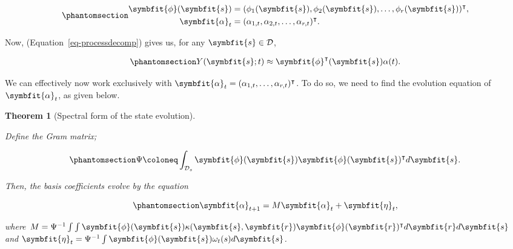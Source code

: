 \documentclass[
]{report}
\newcommand{\bv}[1]{\symbfit{#1}}
\theoremstyle{plain}
\theoremstyle{plain}
\newtheorem{theorem}{Theorem}[section]
\theoremstyle{plain}
\theoremstyle{remark}
\begin{document}
\begin{equation}\phantomsection\label{eq-vecmats}{\begin{split}
\bv \phi(\bv s) &= (\phi_1(\bv s), \phi_2(\bv s), \dots, \phi_r(\bv s))^{\intercal},\\
\bv \alpha_t &= (\alpha_{1,t}, \alpha_{2,t}, \dots, \alpha_{r, t})^{\intercal}.
\end{split}
}\end{equation}

Now, (Equation~\ref{eq-processdecomp}) gives us, for any
\(\bv s\in \mathcal D\),

\begin{equation}\phantomsection\label{eq-pbvec}{\begin{split}
Y(\bv s; t) \approx \bv \phi^{\intercal}(\bv s)  \alpha(t).\\
\end{split}
}\end{equation}

We can effectively now work exclusively with
\(\bv \alpha_t = (\alpha_{1,t},\dots, \alpha_{r,t})^\intercal\). To do
so, we need to find the evolution equation of \(\bv \alpha_t\), as given
below.

\begin{theorem}[Spectral form of the state
evolution]\protect\hypertarget{thm-state_form}{}\label{thm-state_form}

Define the \emph{Gram matrix};

\begin{equation}\phantomsection\label{eq-gram}{\Psi \coloneq \int_{\mathcal D_s} \bv \phi(\bv s) \bv \phi(\bv s)^\intercal d\bv s.
}\end{equation}

Then, the basis coefficients evolve by the equation

\begin{equation}\phantomsection\label{eq-stateev}{\bv \alpha_{t+1} = M \bv\alpha_t + \bv\eta_t,
}\end{equation}

where
\(M = \Psi^{-1} \int\int \bv\phi(\bv s) \kappa(\bv s, \bv r)\bv\phi(\bv r)^\intercal d\bv r d \bv s\)
and \(\bv\eta_t =\Psi^{-1} \int \bv \phi(\bv s)\omega_t(s)d\bv s\).

\end{theorem}
\end{document}
